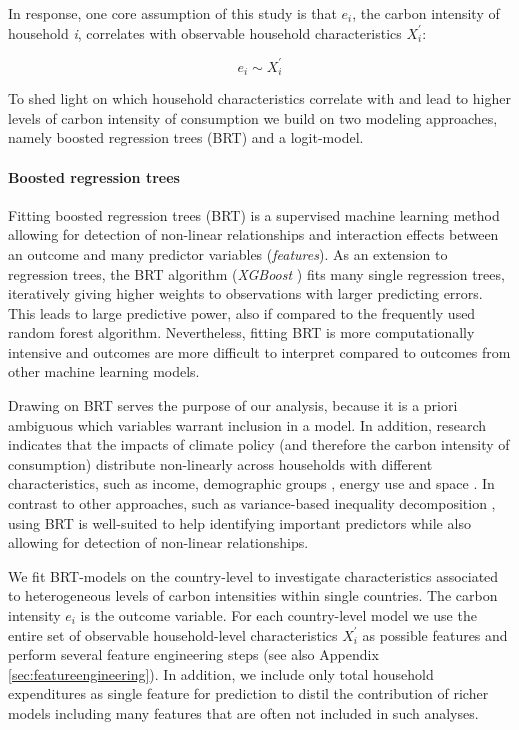 \documentclass[12pt, a4paper]{article}
\begin{document}
In response, one core assumption of this study is that $e_{i}$, the carbon intensity of household \textit{i}, correlates with observable household characteristics $X_{i}^{'}$:

\begin{equation}
    e_{i} \sim X_{i}^{'}
\end{equation}


To shed light on which household characteristics correlate with and lead to higher levels of carbon intensity of consumption we build on two modeling approaches, namely boosted regression trees (BRT) and a logit-model.

\paragraph{Boosted regression trees} Fitting boosted regression trees (BRT) \autocite{Friedman.2003, Elith.2008} is a supervised machine learning method allowing for detection of non-linear relationships and interaction effects between an outcome and many predictor variables (\textit{features}). As an extension to regression trees, the BRT algorithm (\textit{XGBoost} \autocite{Chen.2016}) fits many single regression trees, iteratively giving higher weights to observations with larger predicting errors. This leads to large predictive power, also if compared to the frequently used random forest algorithm. Nevertheless, fitting BRT is more computationally intensive and outcomes are more difficult to interpret compared to outcomes from other machine learning models. %

Drawing on BRT serves the purpose of our analysis, because it is a priori ambiguous which variables warrant inclusion in a model. In addition, research indicates that the impacts of climate policy (and therefore the carbon intensity of consumption) distribute non-linearly across households with different characteristics, such as income, demographic groups \autocite{Missbach.2023}, energy use \autocite{Farrell.2017} and space \autocite{Chan.2023}. In contrast to other approaches, such as variance-based inequality decomposition \autocite{Farrell.2017,Sager.2019b,Missbach.2024}, using BRT is well-suited to help identifying important predictors while also allowing for detection of non-linear relationships.

We fit BRT-models on the country-level to investigate characteristics associated to heterogeneous levels of carbon intensities within single countries. The carbon intensity $e_{i}$ is the outcome variable. For each country-level model we use the entire set of observable household-level characteristics $X_{i}^{'}$ as possible features and perform several feature engineering steps (see also Appendix \ref{sec:featureengineering}). In addition, we include only total household expenditures as single feature for prediction to distil the contribution of richer models including many features that are often not included in such analyses.
\end{document}
